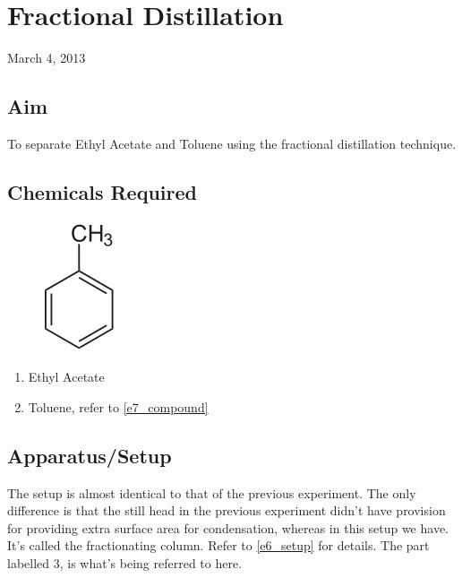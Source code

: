 \chapter{Fractional Distillation}
\begin{flushright}
March 4, 2013
\end{flushright}
\section{Aim}
To separate Ethyl Acetate and Toluene using the fractional distillation technique.

\section {Chemicals Required}
	\begin{figure}[bth]
		\begin{center}
			\includegraphics[width=0.1\linewidth]{gfx/e7_compound}
		\end{center}
	\caption[Aniline]{\label{e7_compound}}
	\end{figure}


	\begin{enumerate}
		\item Ethyl Acetate
		\item Toluene, refer to \autoref{e7_compound}
	\end{enumerate}


\section {Apparatus/Setup}
	The setup is almost identical to that of the previous experiment. The only difference is that the still head in the previous experiment didn't have provision for providing extra surface area for condensation, whereas in this setup we have. It's called the fractionating column. Refer to \autoref{e6_setup} for details. The part labelled 3, is what's being referred to here.

